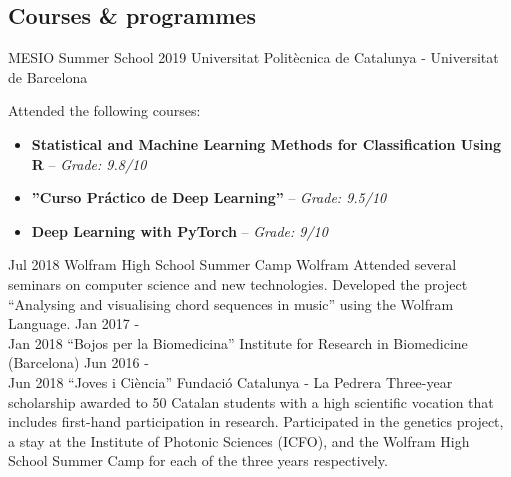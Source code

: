\documentclass[]{resume}
\begin{document}
\begin{adjustwidth}{10pt}{10pt}
\section*{Courses \& programmes}

\renewcommand{\twentylen}{\itemwidth}
\begin{twenty}[\chronowidth]
    {MESIO Summer School 2019}
    {Universitat Politècnica de Catalunya - Universitat de Barcelona}
    {Attended the following courses:
     \begin{itemize}
         \item \textbf{Statistical and Machine Learning Methods for Classification Using R} -- \textit{Grade: 9.8/10}
         \item \textbf{''Curso Práctico de Deep Learning''} --  \textit{Grade: 9.5/10}
         \item \textbf{Deep Learning with PyTorch} --  \textit{Grade: 9/10}
     \end{itemize}
    }
    \twentyitem
    {Jul 2018}
    {Wolfram High School Summer Camp}
    {Wolfram}
    {Attended several seminars on computer science and new technologies. Developed the project ``Analysing and visualising chord sequences in music'' using the Wolfram Language.} %
    \twentyitem
    {Jan 2017 -  \\ Jan 2018}
    {``Bojos per la Biomedicina''}
    {Institute for Research in Biomedicine (Barcelona)}
    {}
    \twentyitem
    {Jun 2016 -  \\ Jun 2018}
    {``Joves i Ciència''}
    {Fundació Catalunya - La Pedrera}
    {Three-year scholarship awarded to 50 Catalan students with a high scientific vocation that includes first-hand participation in research. Participated in the genetics project, a stay at the Institute of Photonic Sciences (ICFO), and the Wolfram High School Summer Camp for each of the three years respectively.}
\end{twenty}


\end{adjustwidth}

\end{document}
